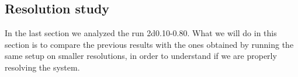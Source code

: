 \subsection{Resolution study}
\begin{figure}[t!]
  \centering
  \centering
      \hfill
    \caption{}
    \label{fig:differentialmach}
 \end{figure}
In the last section we analyzed the run 2d0.10-0.80. What we will do in this section is to compare the previous results with the ones obtained by running the same setup on smaller resolutions, in order to understand if we are properly resolving the system. 

